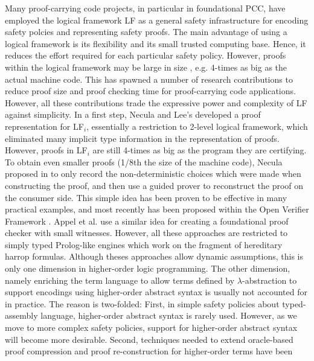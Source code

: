 \documentclass{acmconf}
\begin{document}
Many proof-carrying code projects, in particular in foundational PCC,
have employed the logical framework LF as a general safety
infrastructure for encoding safety polcies and representing safety
proofs\cite{AppelFelty00,Crary:POPL03,AppelFelten99,Crary:CADE03}.
The main advantage of using a logical framework is its flexibility
and its small trusted computing base. Hence, it reduces the effort
required for each particular safety policy. However, proofs within the
logical framework may be large in size 
, e.g. 4-times as big as the
actual machine code. This has spawned a number of research
contributions to reduce proof size and proof checking time for
proof-carrying code applications. However, all these contributions
trade the expressive power and complexity of LF against
simplicity. 
In a first step, Necula and Lee's \cite{Necula98lics} developed a
proof representation for LF$_i$, essentially a restriction to 2-level
logical framework, which eliminated many implicit type information in
the representation of proofs. However, proofs in LF$_i$ are still
4-times as big as the program they are certifying.
To obtain even smaller proofs (1/8th the size of the machine code),
Necula proposed in \cite{Necula+01:oracle} to only record the
non-deterministic choices which were made when constructing the proof,
and then use a guided prover to reconstruct the proof on the consumer
side. This simple idea has been proven to be effective in many
practical examples, and most recently has been proposed within the
Open Verifier Framework \cite{Necula}. Appel et al. use a similar idea
for creating a foundational proof checker with small
witnesses. However, all these approaches are restricted to simply 
typed Prolog-like engines which work on the fragment of hereditary
harrop formulas. Although theses approaches allow dynamic assumptions,
this is only one dimension in higher-order logic programming. The
other dimension, namely enriching the term language to allow terms
defined by $\lambda$-abstraction  to support encodings using higher-order
abstract syntax is usually not accounted for in practice. The reason
is two-folded: First, in simple safety policies about typed-assembly
language, higher-order abstract syntax is rarely used. However, as we
move to more complex safety policies, support for higher-order
abstract syntax will become more desirable. Second, techniques needed
to extend oracle-based proof compression and proof re-construction for
higher-order terms have been 
\end{document}
